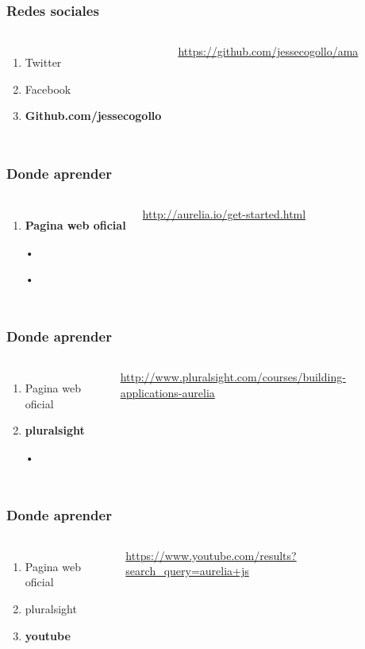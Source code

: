 \documentclass{beamer}
\begin{document}
\begin{frame}
\frametitle{Redes sociales}
\begin{columns}[c]
\begin{enumerate}
\item Twitter
\item Facebook
\item \textbf{Github.com/jessecogollo}
\end{enumerate}
{\color{blue}\url{https://github.com/jessecogollo/ama}}
\end{columns}
\end{frame}
\begin{frame}
\frametitle{Donde aprender}
\begin{columns}[c]
\begin{enumerate}
\item \textbf{Pagina web oficial}
\item[•]
\item[•]
\end{enumerate}
{\color{blue}\url{http://aurelia.io/get-started.html}}
\end{columns}
\end{frame}
\begin{frame}
\frametitle{Donde aprender}
\begin{columns}[c]
\begin{enumerate}
\item Pagina web oficial
\item \textbf{pluralsight}
\item[•]
\end{enumerate}
{\color{blue}\url{http://www.pluralsight.com/courses/building-applications-aurelia}}
\end{columns}
\end{frame}
\begin{frame}
\frametitle{Donde aprender}
\begin{columns}[c]
\begin{enumerate}
\item Pagina web oficial
\item pluralsight
\item \textbf{youtube}
\end{enumerate}
{\color{blue}\url{https://www.youtube.com/results?search_query=aurelia+js}}
\end{columns}
\end{frame}
\end{document}

